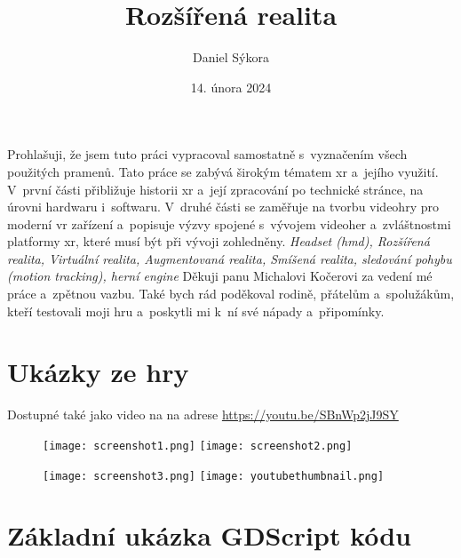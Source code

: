 \documentclass[12pt]{report}
\author{Daniel Sýkora}
\title{Rozšířená realita}
\date{14. února 2024}
\begin{document}
\mytitlepage
\prohlaseni
{
	Prohlašuji, že jsem tuto práci vypracoval samostatně s~vyznačením všech použitých pramenů.
}
\abstrakt
{ %
	Tato práce se zabývá širokým tématem \gls{xr} a~jejího využití. V~první části přibližuje historii \gls{xr} a~její zpracování po technické stránce, na úrovni hardwaru i~softwaru. V~druhé části se zaměřuje na tvorbu videohry pro moderní \gls{vr} zařízení a~popisuje výzvy spojené s~vývojem videoher a~zvláštnostmi platformy \gls{xr}, které musí být při vývoji zohledněny.
}
{ %
	\textit{Headset (\gls{hmd}), Rozšířená realita, Virtuální realita, Augmentovaná realita, Smíšená realita, sledování pohybu (motion tracking), herní engine}
}
\podekovani
{
	Děkuji panu Michalovi Kočerovi za vedení mé práce a~zpětnou vazbu. Také bych rád poděkoval rodině, přátelům a~spolužákům, kteří testovali moji hru a~poskytli mi k~ní své nápady a~připomínky.
}

\tableofcontents
\newpage






\nocite{*}


\sloppy
\printbibliography
\fussy

\printglossary[title={Zkratky}]

\listoffigures
{}

\appendix

\chapter{Ukázky ze hry}\label{apx_screenshots}
Dostupné také jako video na na adrese \url{https://youtu.be/SBnWp2jJ9SY}
\begin{figure}[H]
	\centering
	\texttt{[image: screenshot1.png]}
	\texttt{[image: screenshot2.png]}
\end{figure}
\begin{figure}[H]
	\centering
	\texttt{[image: screenshot3.png]}
	\texttt{[image: youtubethumbnail.png]}
\end{figure}

\chapter{Základní ukázka GDScript kódu}\label{apx_gscript_sample}

\end{document}
